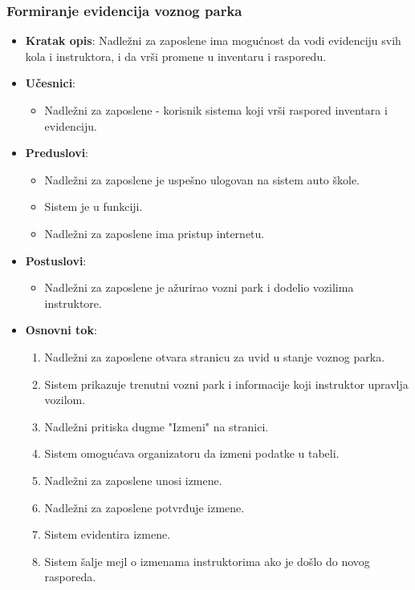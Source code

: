 \subsubsection{Formiranje evidencija voznog parka}
\label{subsubsec:vozni park}
\begin{itemize}
  \item \textbf{Kratak opis}: Nadležni za zaposlene ima mogućnost da vodi evidenciju svih kola i instruktora, i da vrši promene u inventaru i rasporedu.
  \item \textbf{Učesnici}:
    \begin{itemize}
    \item Nadležni za zaposlene - korisnik sistema koji vrši raspored inventara i evidenciju.
    \end{itemize}
  \item \textbf{Preduslovi}:
    \begin{itemize}
    \item  Nadležni za zaposlene je uspešno ulogovan na sistem auto škole.
    \item  Sistem je u funkciji.
    \item  Nadležni za zaposlene ima pristup internetu.
    \end{itemize}
  \item \textbf{Postuslovi}:
      \begin{itemize}
      \item  Nadležni za zaposlene je ažurirao vozni park i dodelio vozilima instruktore.
      \end{itemize}
  \item \textbf{Osnovni tok}:
      \begin{enumerate}
        \item Nadležni za zaposlene otvara stranicu za uvid  u stanje voznog parka.
        \item Sistem prikazuje trenutni vozni park i informacije koji instruktor upravlja vozilom.
        \item Nadležni pritiska dugme "Izmeni"  na stranici.
        \item Sistem omogućava organizatoru da izmeni podatke u tabeli.
        \item Nadležni za zaposlene unosi izmene.
        \item Nadležni za zaposlene potvrđuje izmene.
        \item Sistem evidentira izmene.
        \item Sistem šalje mejl o izmenama instruktorima ako je došlo do novog rasporeda.
      \end{enumerate}


\end{itemize}
